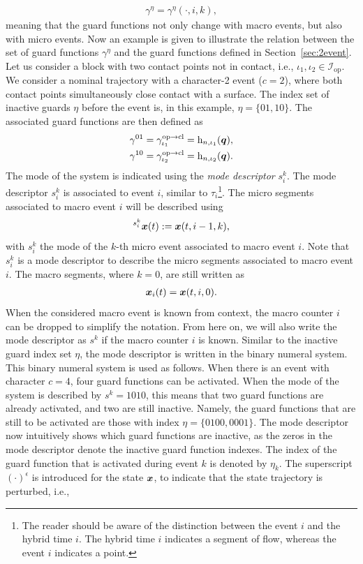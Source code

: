 \documentclass[../DC2017114Bouma.tex]{subfiles}
\begin{document}
\begin{align}
\gamma^\eta = \gamma^\eta(\cdot,i,k),\label{eq:4gammaik}
\end{align}
meaning that the guard functions not only change with macro events, but also with micro events. Now an example is given to illustrate the relation between the set of guard functions $\gamma^\eta$ and the guard functions defined in Section~\ref{sec:2event}. Let us consider a block with two contact points not in contact, i.e., $\iota_1,\iota_2\in\mathcal{I}_{\text{op}}$. We consider a nominal trajectory with a character-2 event ($c=2$), where both contact points simultaneously close contact with a surface. The index set of inactive guards $\eta$ before the event is, in this example, $\eta = \{01,10\}$. The associated guard functions are then defined as
\begin{align}
\gamma^{01} &= \gamma^{\text{op}\rightarrow\text{cl}}_{\iota_1} = \mathrm{h}_{n,\iota_1}({\boldsymbol{q}}),\\
\gamma^{10} &= \gamma^{\text{op}\rightarrow\text{cl}}_{\iota_2} = \mathrm{h}_{n,\iota_2}({\boldsymbol{q}}).
\end{align}
The mode of the system is indicated using the \textit{mode descriptor} $s^k_i$. The mode descriptor $s^k_i$ is associated to event $i$, similar to $\tau_i$\footnote{The reader should be aware of the distinction between the event $i$ and the hybrid time $i$. The hybrid time $i$ indicates a segment of flow, whereas the event $i$ indicates a point.}. The micro segments associated to macro event $i$ will be described using
\begin{align}
\hspace{0cm}^{s^k_i}{\boldsymbol{x}}(t) := {\boldsymbol{x}}(t,i-1,k),
\end{align}
with $s^k_i$ the mode of the $k$-th micro event associated to macro event $i$. Note that $s_i^k$ is a mode descriptor to describe the micro segments associated to macro event $i$. The macro segments, where $k=0$, are still written as 
\begin{align}
{\boldsymbol{x}}_i(t) = {\boldsymbol{x}}(t,i,0).
\end{align}
When the considered macro event is known from context, the macro counter $i$ can be dropped to simplify the notation. From here on, we will also write the mode descriptor as $s^k$ if the macro counter $i$ is known. Similar to the inactive guard index set $\eta$, the mode descriptor is written in the binary numeral system. This binary numeral system is used as follows. When there is an event with character $c = 4$, four guard functions can be activated. When the mode of the system is described by $s^k = 1010$, this means that two guard functions are already activated, and two are still inactive. Namely, the guard functions that are still to be activated are those with index $\eta = \{0100,0001\}$. The mode descriptor now intuitively shows which guard functions are inactive, as the zeros in the mode descriptor denote the inactive guard function indexes. The index of the guard function that is activated during event $k$ is denoted by $\eta_k$. The superscript $(\cdot)^{\epsilon}$ is introduced for the state ${\boldsymbol{x}}$, to indicate that the state trajectory is perturbed, i.e.,
\end{document}
